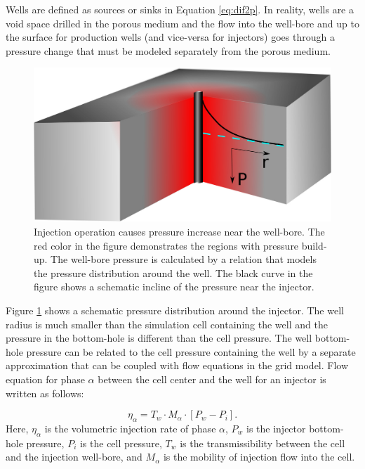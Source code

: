 Wells are defined as sources or sinks in Equation \ref{eq:dif2p}. In reality, wells
are a void space drilled in the porous medium and the flow into the
well-bore and up to the surface for production wells (and vice-versa for injectors)
goes through a pressure change that must be modeled separately from the porous
medium. 


\begin{figure}
 \centering{}
 \includegraphics[width=0.4\linewidth]{./figurer/WModel}
 \caption{Injection operation causes pressure increase near the well-bore. The red color in the figure demonstrates the regions with pressure build-up. The well-bore pressure is calculated by a relation that models the pressure distribution around the well. The black curve in the figure shows a schematic incline of the pressure near the injector.}
 \label{fig:WM}
\end{figure}

Figure \ref{fig:WM} shows a schematic pressure distribution around the
injector. The well radius is much smaller than the simulation cell containing
the well and the pressure in the bottom-hole is different than the cell
pressure. The well bottom-hole pressure can be related to the cell pressure
containing the well by a separate approximation that can be coupled with flow equations in the grid model. Flow equation for phase $\alpha$ between the
cell center and the well for an injector is written as follows:

\begin{equation}
 \eta_{\alpha}=T_w\cdot M_{\alpha}\cdot [P_w-P_{{i}}].
 \label{eq:WFLW}
\end{equation} Here, $\eta_{\alpha}$ is the volumetric injection rate of phase
$\alpha$, $P_w$ is the injector bottom-hole pressure, $P_{{i}}$ is the
cell pressure, $T_{w}$ is the transmissibility between the cell and the
injection well-bore, and $M_\alpha$ is the mobility of injection flow into the
cell. 

